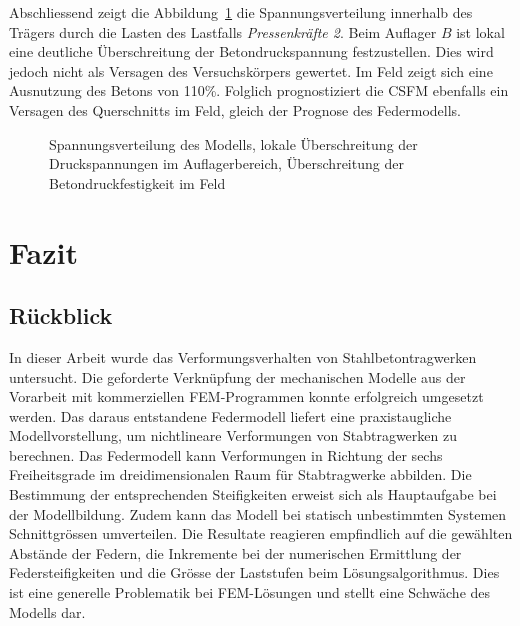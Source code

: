 \documentclass[
  11pt,
  letterpaper,
]{scrreprt}
\begin{document}
Abschliessend zeigt die Abbildung~\ref{fig-versagen_ideastat} die
Spannungsverteilung innerhalb des Trägers durch die Lasten des Lastfalls
\emph{Pressenkräfte 2}. Beim Auflager \(B\) ist lokal eine deutliche
Überschreitung der Betondruckspannung festzustellen. Dies wird jedoch
nicht als Versagen des Versuchskörpers gewertet. Im Feld zeigt sich eine
Ausnutzung des Betons von 110\%. Folglich prognostiziert die CSFM
ebenfalls ein Versagen des Querschnitts im Feld, gleich der Prognose des
Federmodells.

\begin{figure}[H]


\caption{\label{fig-versagen_ideastat}Spannungsverteilung des Modells,
lokale Überschreitung der Druckspannungen im Auflagerbereich,
Überschreitung der Betondruckfestigkeit im Feld}

\end{figure}%


\chapter{Fazit}\label{fazit}

\section{Rückblick}\label{ruxfcckblick}

In dieser Arbeit wurde das Verformungsverhalten von Stahlbetontragwerken
untersucht. Die geforderte Verknüpfung der mechanischen Modelle aus der
Vorarbeit mit kommerziellen FEM-Programmen konnte erfolgreich umgesetzt
werden. Das daraus entstandene Federmodell liefert eine praxistaugliche
Modellvorstellung, um nichtlineare Verformungen von Stabtragwerken zu
berechnen. Das Federmodell kann Verformungen in Richtung der sechs
Freiheitsgrade im dreidimensionalen Raum für Stabtragwerke abbilden. Die
Bestimmung der entsprechenden Steifigkeiten erweist sich als
Hauptaufgabe bei der Modellbildung. Zudem kann das Modell bei statisch
unbestimmten Systemen Schnittgrössen umverteilen. Die Resultate
reagieren empfindlich auf die gewählten Abstände der Federn, die
Inkremente bei der numerischen Ermittlung der Federsteifigkeiten und die
Grösse der Laststufen beim Lösungsalgorithmus. Dies ist eine generelle
Problematik bei FEM-Lösungen und stellt eine Schwäche des Modells dar.
\end{document}
